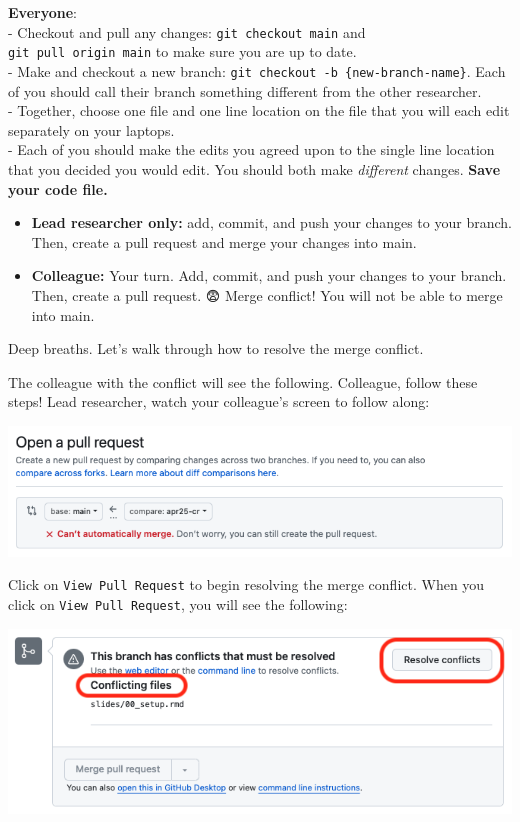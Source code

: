 \documentclass[
]{book}
\providecommand{\tightlist}{%
  \setlength{\itemsep}{0pt}\setlength{\parskip}{0pt}}
\begin{document}
\textbf{Everyone}:\\
- Checkout and pull any changes: \texttt{git\ checkout\ main} and \texttt{git\ pull\ origin\ main} to make sure you are up to date.\\
- Make and checkout a new branch: \texttt{git\ checkout\ -b\ \{new-branch-name\}}. Each of
you should call their branch something different from the other researcher.\\
- Together, choose one file and one line location on the file that you will each
edit separately on your laptops.\\
- Each of you should make the edits you agreed upon to the single line location that you decided you would edit. You should both make \emph{different} changes. \textbf{Save your code file.}

\begin{itemize}
\tightlist
\item
  \textbf{Lead researcher only:} add, commit, and push your changes to your branch.
  Then, create a pull request and merge your changes into main.
\end{itemize}

\begin{itemize}
\tightlist
\item
  \textbf{Colleague:} Your turn. Add, commit, and push your changes to your branch.
  Then, create a pull request. 😨 Merge conflict! You will not
  be able to merge into main.
\end{itemize}

Deep breaths. Let's walk through how to resolve the merge conflict.

The colleague with the conflict will see the following. Colleague, follow these steps!
Lead researcher, watch your colleague's screen to follow along:

\includegraphics[width=1\linewidth]{./figures/merge-conflict-1}

Click on \texttt{View\ Pull\ Request} to begin resolving the merge conflict. When you click on \texttt{View\ Pull\ Request}, you will see the following:

\includegraphics[width=1\linewidth]{./figures/merge-conflict-2}
\end{document}
